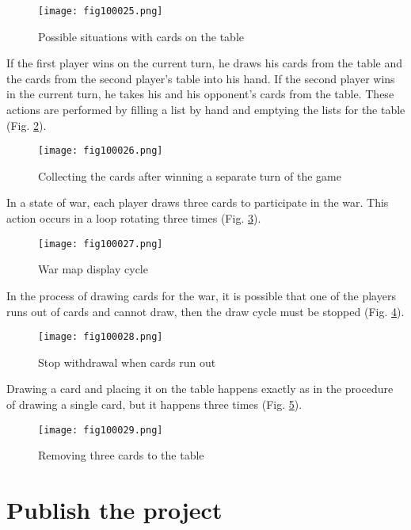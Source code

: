 \begin{figure}[H]
   \centering
   \texttt{[image: fig100025.png]}
   \caption{Possible situations with cards on the table}
\label{fig100025}
\end{figure}

If the first player wins on the current turn, he draws his cards from the table and the cards from the second player's table into his hand. If the second player wins in the current turn, he takes his and his opponent's cards from the table. These actions are performed by filling a list by hand and emptying the lists for the table (Fig. \ref{fig100026}).

\begin{figure}[H]
   \centering
   \texttt{[image: fig100026.png]}
   \caption{Collecting the cards after winning a separate turn of the game}
\label{fig100026}
\end{figure}

In a state of war, each player draws three cards to participate in the war. This action occurs in a loop rotating three times (Fig. \ref{fig100027}).

\begin{figure}[H]
   \centering
   \texttt{[image: fig100027.png]}
   \caption{War map display cycle}
\label{fig100027}
\end{figure}

In the process of drawing cards for the war, it is possible that one of the players runs out of cards and cannot draw, then the draw cycle must be stopped (Fig. \ref{fig100028}).

\begin{figure}[H]
   \centering
   \texttt{[image: fig100028.png]}
   \caption{Stop withdrawal when cards run out}
\label{fig100028}
\end{figure}

Drawing a card and placing it on the table happens exactly as in the procedure of drawing a single card, but it happens three times (Fig. \ref{fig100029}).

\begin{figure}[H]
   \centering
   \texttt{[image: fig100029.png]}
   \caption{Removing three cards to the table}
\label{fig100029}
\end{figure}

\section{Publish the project}

